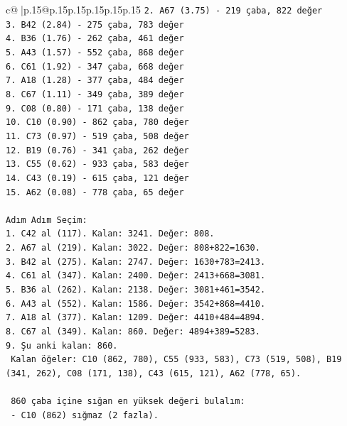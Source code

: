 \documentclass{article}
\begin{document}
{\begin{supertabular}{c@{$\;$}|p{.15\linewidth}@{}p{.15\linewidth}p{.15\linewidth}p{.15\linewidth}p{.15\linewidth}p{.15\linewidth}}
{{{\texttt{2. A67 (3.75) {-} 219 çaba, 822 değer} \\
\texttt{3. B42 (2.84) {-} 275 çaba, 783 değer} \\
\texttt{4. B36 (1.76) {-} 262 çaba, 461 değer} \\
\texttt{5. A43 (1.57) {-} 552 çaba, 868 değer} \\
\texttt{6. C61 (1.92) {-} 347 çaba, 668 değer} \\
\texttt{7. A18 (1.28) {-} 377 çaba, 484 değer} \\
\texttt{8. C67 (1.11) {-} 349 çaba, 389 değer} \\
\texttt{9. C08 (0.80) {-} 171 çaba, 138 değer} \\
\texttt{10. C10 (0.90) {-} 862 çaba, 780 değer} \\
\texttt{11. C73 (0.97) {-} 519 çaba, 508 değer} \\
\texttt{12. B19 (0.76) {-} 341 çaba, 262 değer} \\
\texttt{13. C55 (0.62) {-} 933 çaba, 583 değer} \\
\texttt{14. C43 (0.19) {-} 615 çaba, 121 değer} \\
\texttt{15. A62 (0.08) {-} 778 çaba, 65 değer} \\
\\ 
\texttt{Adım Adım Seçim:} \\
\texttt{1. C42 al (117). Kalan: 3241. Değer: 808.} \\
\texttt{2. A67 al (219). Kalan: 3022. Değer: 808+822=1630.} \\
\texttt{3. B42 al (275). Kalan: 2747. Değer: 1630+783=2413.} \\
\texttt{4. C61 al (347). Kalan: 2400. Değer: 2413+668=3081.} \\
\texttt{5. B36 al (262). Kalan: 2138. Değer: 3081+461=3542.} \\
\texttt{6. A43 al (552). Kalan: 1586. Değer: 3542+868=4410.} \\
\texttt{7. A18 al (377). Kalan: 1209. Değer: 4410+484=4894.} \\
\texttt{8. C67 al (349). Kalan: 860. Değer: 4894+389=5283.} \\
\texttt{9. Şu anki kalan: 860.} \\
\texttt{   Kalan öğeler: C10 (862, 780), C55 (933, 583), C73 (519, 508), B19 (341, 262), C08 (171, 138), C43 (615, 121), A62 (778, 65).} \\
\\ 
\texttt{   860 çaba içine sığan en yüksek değeri bulalım:} \\
\texttt{   {-} C10 (862) sığmaz (2 fazla).} \\
}}}
\end{supertabular}}
\end{document}
